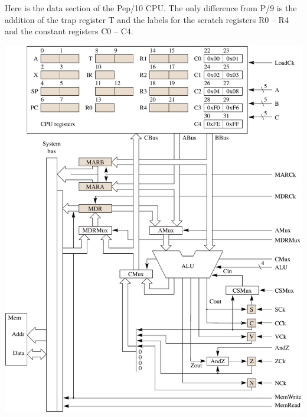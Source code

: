\documentclass[10pt,fleqn]{book}
\begin{document}
\newpage

\noindent Here is the data section of the Pep/10 CPU.
The only difference from P/9 is the addition of the trap register T and the labels for the scratch registers R0 -- R4 and the constant registers C0 -- C4.
\\
\begin{center}
\includegraphics{pep10-1-byte-bus}
\end{center}
\end{document}
